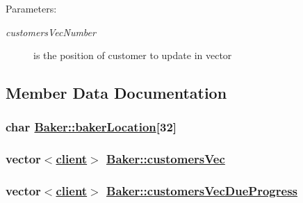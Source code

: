\begin{Desc}
\item[Parameters:]
\begin{description}
\item[{\em customers\-Vec\-Number}]is the position of customer to update in vector \end{description}
\end{Desc}


\subsection{Member Data Documentation}
\hypertarget{class_baker_c8a23bee3af95af3a6fa8e3f631e9a92}{
\subsubsection[bakerLocation]{\setlength{\rightskip}{0pt plus 5cm}char \hyperlink{class_baker_c8a23bee3af95af3a6fa8e3f631e9a92}{Baker::baker\-Location}\mbox{[}32\mbox{]}}}
\label{class_baker_c8a23bee3af95af3a6fa8e3f631e9a92}


\hypertarget{class_baker_52cc86469dd41b9be5b7186d6bd00589}{
\subsubsection[customersVec]{\setlength{\rightskip}{0pt plus 5cm}vector$<$\hyperlink{classclient}{client}$>$ \hyperlink{class_baker_52cc86469dd41b9be5b7186d6bd00589}{Baker::customers\-Vec}}}
\label{class_baker_52cc86469dd41b9be5b7186d6bd00589}


\hypertarget{class_baker_e9843b8d2c12d0911de538ebe51c1b0d}{
\subsubsection[customersVecDueProgress]{\setlength{\rightskip}{0pt plus 5cm}vector$<$\hyperlink{classclient}{client}$>$ \hyperlink{class_baker_e9843b8d2c12d0911de538ebe51c1b0d}{Baker::customers\-Vec\-Due\-Progress}}}
\label{class_baker_e9843b8d2c12d0911de538ebe51c1b0d}


